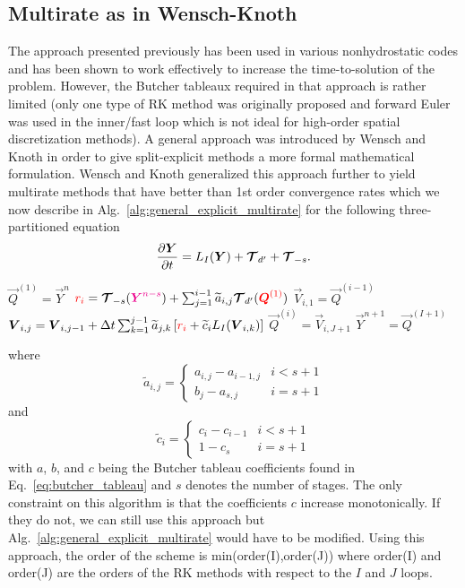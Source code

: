 \documentclass{report}
\begin{document}
\subsection{Multirate as in Wensch-Knoth}
The approach presented previously has been used in various nonhydrostatic codes and has been shown to work effectively to increase the time-to-solution of the problem.  However, the Butcher tableaux required in that approach is rather limited (only one type of RK method was originally proposed and forward Euler was used in the inner/fast loop which is not ideal for high-order spatial discretization methods).  A general approach was introduced by Wensch and Knoth in order to give split-explicit methods a more formal mathematical formulation.  Wensch and Knoth generalized this approach further to yield multirate methods that have better than 1st order convergence rates which we now describe in Alg.\ \ref{alg:general_explicit_multirate} for the following three-partitioned equation
\[
\frac{\partial \boldsymbol{{Y}}}{\partial t}= L_I(\boldsymbol{{Y}}) +  \boldsymbol{{\mathcal{T}}}_{d'} + \boldsymbol{{\mathcal{T}}}_{-s}.
\]
\begin{algorithm}
\label{alg:general_explicit_multirate}
\begin{algorithmic}
\State
{}
\State $\vec{Q}^{(1)}=\vec{Y}^n$ 
\State $\textcolor{red}{r_i}=\boldsymbol{{\mathcal{T}}}_{-s}(\textcolor{magenta}{ \boldsymbol{{Y}}^{n-s}}) + \sum_{j=1}^{i-1} \widetilde{a}_{i,j} \boldsymbol{{\mathcal{T}}}_{d'}(\textcolor{red}{\boldsymbol{{Q}}^{(1)}})$
\State $\vec{V}_{i,1}=\vec{Q}^{(i-1)}$
\State $\boldsymbol{{V}}_{i,j}=\boldsymbol{{V}}_{i,j-1} + \Delta t \sum_{k=1}^{j-1} \widetilde{a}_{j,k} \left[ \textcolor{red}{r_i} + \widetilde{c}_{i} L_I(\boldsymbol{{V}}_{i,k}) \right]$ 
\EndFor %
\State $\vec{Q}^{(i)}=\vec{V}_{i,J+1}$
\EndFor %
\State $\vec{Y}^{n+1}=\vec{Q}^{(I+1)}$
\EndFunction
\end{algorithmic}
\end{algorithm}
where 
\[
\widetilde{a}_{i,j}=\left\{
\begin{array}{cc}
  {a}_{i,j}-{a}_{i-1,j}   &  i < s+1 \\
  {b}_{j}-{a}_{s,j}   &  i = s+1  
\end{array}
\right.
\]
and
\[
\widetilde{c}_{i}=\left\{
\begin{array}{cc}
  {c}_{i}-{c}_{i-1}   &  i < s+1 \\
  1-{c}_{s}   &  i = s+1  
\end{array}
\right.
\]
with $a$, $b$, and $c$ being the Butcher tableau coefficients found in Eq.\ \eqref{eq:butcher_tableau} and $s$ denotes the number of stages.  The only constraint on this algorithm is that the coefficients $c$ increase monotonically. If they do not, we can still use this approach but Alg.\ \ref{alg:general_explicit_multirate} would have to be modified.  Using this approach, the order of the scheme is min(order(I),order(J)) where  order(I) and order(J) are the orders of the RK methods with respect to the $I$ and $J$ loops.
\end{document}
